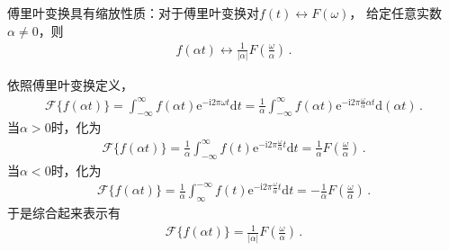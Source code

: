 \begin{theorem}
    傅里叶变换具有缩放性质：对于傅里叶变换对$f(t)\leftrightarrow F(\omega)$，
    给定任意实数$\alpha\neq0$，则
    \begin{align}
        f(\alpha t)\leftrightarrow\frac{1}{|\alpha|} F\left(\frac{\omega}{\alpha}\right)\, .
    \end{align}
\end{theorem}
\begin{prove}
    依照傅里叶变换定义，
    \begin{align}\label{eq:7.ex01.scale}
        \mathcal{F}\{f(\alpha t)\}=\int_{-\infty}^{\infty}f(\alpha t)\mathrm{e}^{-\mathrm{i}2\pi\omega t}\mathrm{d}t
        =\frac{1}{\alpha}\int_{-\infty}^{\infty}f(\alpha t)\mathrm{e}^{-\mathrm{i}2\pi\frac{\omega}{\alpha}\alpha t}\mathrm{d}(\alpha t)\, .
    \end{align}
    当$\alpha>0$时，化为
    \begin{align}
        \mathcal{F}\{f(\alpha t)\}=\frac{1}{\alpha}\int_{-\infty}^{\infty}f(t)\mathrm{e}^{-\mathrm{i}2\pi\frac{\omega}{\alpha}t}\mathrm{d}t
        =\frac{1}{\alpha}F\left(\frac{\omega}{\alpha}\right)\, .
    \end{align}
    当$\alpha<0$时，化为
    \begin{align}
        \mathcal{F}\{f(\alpha t)\}=\frac{1}{\alpha}\int_{\infty}^{-\infty}f(t)\mathrm{e}^{-\mathrm{i}2\pi\frac{\omega}{\alpha}t}\mathrm{d}t
        =-\frac{1}{\alpha}F\left(\frac{\omega}{\alpha}\right)\, .
    \end{align}
    于是综合起来表示有
    \begin{align}
        \mathcal{F}\{f(\alpha t)\}=\frac{1}{|\alpha|}F\left(\frac{\omega}{\alpha}\right)\, .
    \end{align}
\end{prove}

